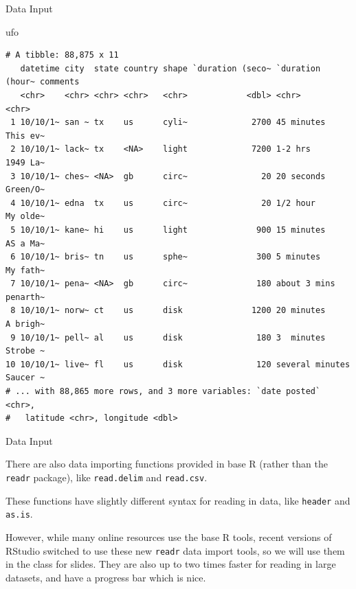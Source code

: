 \documentclass[
  ignorenonframetext,
]{beamer}
\newenvironment{Shaded}{\begin{snugshade}}{\end{snugshade}}
\newcommand{\NormalTok}[1]{#1}
\begin{document}
\begin{frame}[fragile]{Data Input}
\protect\hypertarget{data-input-10}{}

\begin{Shaded}
\begin{Highlighting}[]
\NormalTok{ufo}
\end{Highlighting}
\end{Shaded}

\begin{verbatim}
# A tibble: 88,875 x 11
   datetime city  state country shape `duration (seco~ `duration (hour~ comments
   <chr>    <chr> <chr> <chr>   <chr>            <dbl> <chr>            <chr>   
 1 10/10/1~ san ~ tx    us      cyli~             2700 45 minutes       This ev~
 2 10/10/1~ lack~ tx    <NA>    light             7200 1-2 hrs          1949 La~
 3 10/10/1~ ches~ <NA>  gb      circ~               20 20 seconds       Green/O~
 4 10/10/1~ edna  tx    us      circ~               20 1/2 hour         My olde~
 5 10/10/1~ kane~ hi    us      light              900 15 minutes       AS a Ma~
 6 10/10/1~ bris~ tn    us      sphe~              300 5 minutes        My fath~
 7 10/10/1~ pena~ <NA>  gb      circ~              180 about 3 mins     penarth~
 8 10/10/1~ norw~ ct    us      disk              1200 20 minutes       A brigh~
 9 10/10/1~ pell~ al    us      disk               180 3  minutes       Strobe ~
10 10/10/1~ live~ fl    us      disk               120 several minutes  Saucer ~
# ... with 88,865 more rows, and 3 more variables: `date posted` <chr>,
#   latitude <chr>, longitude <dbl>
\end{verbatim}

\end{frame}

\begin{frame}[fragile]{Data Input}
\protect\hypertarget{data-input-11}{}

There are also data importing functions provided in base R (rather than
the \texttt{readr} package), like \texttt{read.delim} and
\texttt{read.csv}.

These functions have slightly different syntax for reading in data, like
\texttt{header} and \texttt{as.is}.

However, while many online resources use the base R tools, recent
versions of RStudio switched to use these new \texttt{readr} data import
tools, so we will use them in the class for slides. They are also up to
two times faster for reading in large datasets, and have a progress bar
which is nice.

\end{frame}
\end{document}
